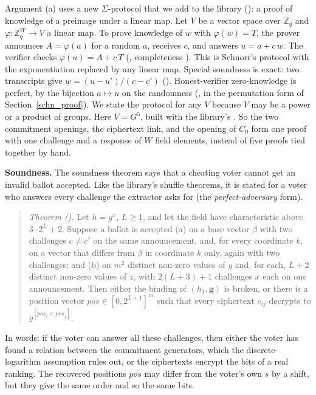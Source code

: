 Argument (a) uses a new $\Sigma$-protocol that we add to the library
(): a proof of
knowledge of a preimage under a linear map. Let $V$ be a vector space
over $\mathbb{Z}_q$ and $\varphi : \mathbb{Z}_q^W \to V$ a linear map. To
prove knowledge of $w$ with $\varphi(w) = T$, the prover announces $A =
\varphi(a)$ for a random $a$, receives $c$, and answers $u = a + c\,w$.
The verifier checks $\varphi(u) = A + c\,T$ (,
completeness ). This is Schnorr's protocol with
the exponentiation replaced by any linear map. Special soundness is
exact: two transcripts give $w = (u - u')/(c - c')$
(). Honest-verifier zero-knowledge is perfect, by
the bijection $a \mapsto u$ on the randomness (, in the
permutation form of Section~\ref{schn_proof}). We state the protocol for
any $V$ because $V$ may be a power or a product of groups. Here $V =
G^5$, built with the library's .
So the two commitment openings, the ciphertext link, and the opening of
$C_0$ form one proof with one challenge and a response of $W$ field
elements, instead of five proofs tied together by hand.

\textbf{Soundness.} The soundness theorem says that a cheating voter
cannot get an invalid ballot accepted. Like the library's shuffle
theorems, it is stated for a voter who answers every challenge the
extractor asks for (the \emph{perfect-adversary} form). 
\begin{quote}
  \emph{Theorem ().} Let $h = g^x$, $L \ge 1$, and
  let the field have characteristic above $3 \cdot 2^L + 2$. Suppose a
  ballot is accepted (a) on a base vector $\beta$ with
  two challenges $c \ne c'$ on the same announcement, and, for every
  coordinate $k$, on a vector that differs from $\beta$ in coordinate $k$
  only, again with two challenges; and (b) on $m^2$ distinct non-zero
  values of $y$ and, for each, $L + 2$ distinct non-zero values of $z$,
  with $2(L+3)+1$ challenges $x$ each on one announcement. Then either
  the binding of $(h_1, \mathbf{g})$ is broken, or there is a position
  vector $\mathit{pos} \in [0, 2^{L+1}]^m$ such that every ciphertext
  $c_{ij}$ decrypts to $g^{[\mathit{pos}_i < \mathit{pos}_j]}$.
\end{quote}
In words: if the voter can answer all these challenges, then either the
voter has found a relation between the commitment generators, which the
discrete-logarithm assumption rules out, or the ciphertexts encrypt the
bits of a real ranking. The recovered positions $\mathit{pos}$ may differ
from the voter's own $s$ by a shift, but they give the same order and so
the same bits.

